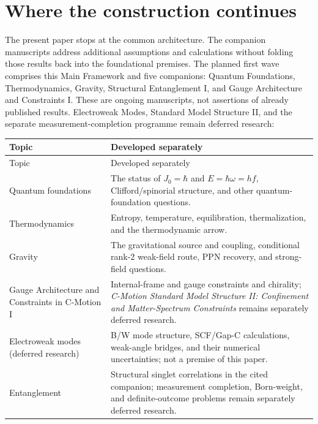 \documentclass[11pt]{article}
\theoremstyle{definition}
\newcommand{\cmotion}{\mbox{C-Motion}}
\begin{document}
\section{Where the construction continues}
\label{sec:companions}

The present paper stops at the common architecture.  The companion manuscripts
address additional assumptions and calculations without folding those results
back into the foundational premises.  The planned first wave comprises this
Main Framework and five companions: Quantum Foundations, Thermodynamics, Gravity,
Structural Entanglement I, and Gauge Architecture and Constraints I.  These are
ongoing manuscripts, not assertions of already published results.  Electroweak
Modes, Standard Model Structure II, and the separate measurement-completion
programme remain deferred research:

\begin{longtable}{@{}P{4.0cm}P{10.6cm}@{}}
\toprule
Topic & Developed separately \\
\midrule
\endfirsthead
\toprule
Topic & Developed separately \\
\midrule
\endhead
Quantum foundations \cite{CmotionQuantumFoundations2026}
& The status of $J_0=\hbar$ and $E=\hbar\omega=hf$, Clifford/spinorial structure, and other quantum-foundation questions. \\
Thermodynamics \cite{CmotionThermodynamics2026}
& Entropy, temperature, equilibration, thermalization, and the thermodynamic arrow. \\
Gravity \cite{CmotionWeakFieldGravity2026}
& The gravitational source and coupling, conditional rank-2 weak-field route, PPN recovery, and strong-field questions. \\
Gauge Architecture and Constraints in \cmotion{} I \cite{CmotionSMStructureI2026}
& Internal-frame and gauge constraints and chirality;
\emph{C-Motion Standard Model Structure II: Confinement and Matter-Spectrum
Constraints} remains separately deferred research. \\
Electroweak modes (deferred research)
& B/W mode structure, SCF/Gap-C calculations, weak-angle bridges, and their numerical uncertainties; not a premise of this paper. \\
Entanglement \cite{CmotionEntanglementSinglet2026}
& Structural singlet correlations in the cited companion; measurement completion, Born-weight, and definite-outcome problems remain separately deferred research. \\
\bottomrule
\end{longtable}
\end{document}
